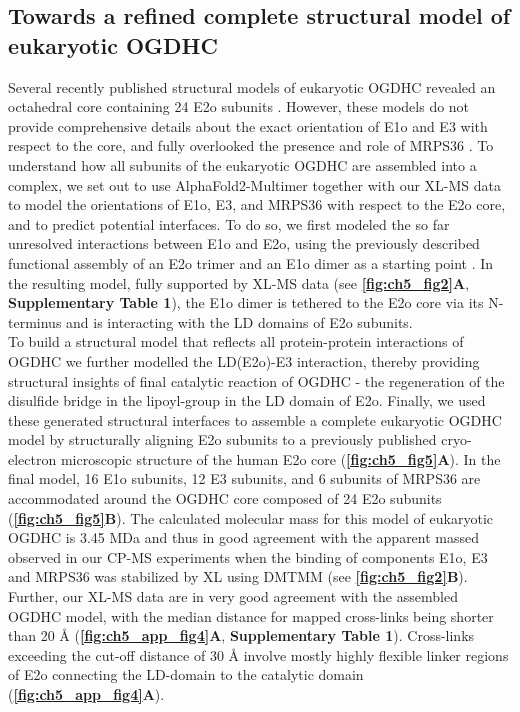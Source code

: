 \subsection*{Towards a refined complete structural model of eukaryotic OGDHC}
Several recently published structural models of eukaryotic OGDHC revealed an octahedral core containing 24 E2o subunits \cite{Lengyel_2008, Liu_2022, Nagy_2021}. However, these models do not provide comprehensive details about the exact orientation of E1o and E3 with respect to the core, and fully overlooked the presence and role of MRPS36 \cite{Lengyel_2008, Liu_2022, Nagy_2021}. To understand how all subunits of the eukaryotic OGDHC are assembled into a complex, we set out to use AlphaFold2-Multimer \cite{Evans_2022} together with our XL-MS data to model the orientations of E1o, E3, and MRPS36 with respect to the E2o core, and to predict potential interfaces. To do so, we first modeled the so far unresolved interactions between E1o and E2o, using the previously described functional assembly of an E2o trimer and an E1o dimer as a starting point \cite{Perham_1991, Perham_2000, Reed_1974}. In the resulting model, fully supported by XL-MS data (see \textbf{\autoref{fig:ch5_fig2}A}, \textbf{Supplementary Table 1}), the E1o dimer is tethered to the E2o core via its N-terminus and is interacting with the LD domains of E2o subunits.\\ 
To build a structural model that reflects all protein-protein interactions of OGDHC we further modelled the LD(E2o)-E3 interaction, thereby providing structural insights of final catalytic reaction of OGDHC - the regeneration of the disulfide bridge in the lipoyl-group in the LD domain of E2o. Finally, we used these generated structural interfaces to assemble a complete eukaryotic OGDHC model by structurally aligning E2o subunits to a previously published cryo-electron microscopic structure of the human E2o core \cite{Nagy_2021} (\textbf{\autoref{fig:ch5_fig5}A}). In the final model, 16 E1o subunits, 12 E3 subunits, and 6 subunits of MRPS36 are accommodated around the OGDHC core composed of 24 E2o subunits (\textbf{\autoref{fig:ch5_fig5}B}). The calculated molecular mass for this model of eukaryotic OGDHC is 3.45 MDa and thus in good agreement with the apparent massed observed in our CP-MS experiments when the binding of components E1o, E3 and MRPS36 was stabilized by XL using DMTMM (see \textbf{\autoref{fig:ch5_fig2}B}). Further, our XL-MS data are in very good agreement with the assembled OGDHC model, with the median distance for mapped cross-links being shorter than 20 Å (\textbf{\autoref{fig:ch5_app_fig4}A}, \textbf{Supplementary Table 1}). Cross-links exceeding the cut-off distance of 30 Å involve mostly highly flexible linker regions of E2o connecting the LD-domain to the catalytic domain (\textbf{\autoref{fig:ch5_app_fig4}A}).\\

